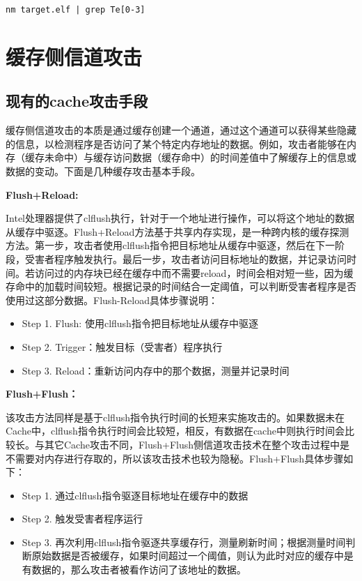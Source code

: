 \begin{lstlisting}[language=shell]
	 nm target.elf | grep Te[0-3]
\end{lstlisting}




\section{缓存侧信道攻击}
\subsection{现有的cache攻击手段}
缓存侧信道攻击的本质是通过缓存创建一个通道，通过这个通道可以获得某些隐藏的信息，以检测程序是否访问了某个特定内存地址的数据。例如，攻击者能够在内存（缓存未命中）与缓存访问数据（缓存命中）的时间差值中了解缓存上的信息或数据的变动。下面是几种缓存攻击基本手段。

\textbf{Flush+Reload:}

Intel处理器提供了clflush执行，针对于一个地址进行操作，可以将这个地址的数据从缓存中驱逐。Flush+Reload方法基于共享内存实现，是一种跨内核的缓存探测方法。第一步，攻击者使用clflush指令把目标地址从缓存中驱逐，然后在下一阶段，受害者程序触发执行。最后一步，攻击者访问目标地址的数据，并记录访问时间。若访问过的内存块已经在缓存中而不需要reload，时间会相对短一些，因为缓存命中的加载时间较短。根据记录的时间结合一定阈值，可以判断受害者程序是否使用过这部分数据。Flush-Reload具体步骤说明：

\begin{itemize}
	\item Step 1. Flush: 使用clflush指令把目标地址从缓存中驱逐
	\item Step 2. Trigger：触发目标（受害者）程序执行
	\item Step 3. Reload：重新访问内存中的那个数据，测量并记录时间
\end{itemize}


\textbf{Flush+Flush：}

该攻击方法同样是基于clflush指令执行时间的长短来实施攻击的。如果数据未在Cache中，clflush指令执行时间会比较短，相反，有数据在cache中则执行时间会比较长。与其它Cache攻击不同，Flush+Flush侧信道攻击技术在整个攻击过程中是不需要对内存进行存取的，所以该攻击技术也较为隐秘。Flush+Flush具体步骤如下：

\begin{itemize}
	\item Step 1. 通过clflush指令驱逐目标地址在缓存中的数据
	\item Step 2. 触发受害者程序运行
	\item Step 3. 再次利用clflush指令驱逐共享缓存行，测量刷新时间；根据测量时间判断原始数据是否被缓存，如果时间超过一个阈值，则认为此时对应的缓存中是有数据的，那么攻击者被看作访问了该地址的数据。
\end{itemize}

